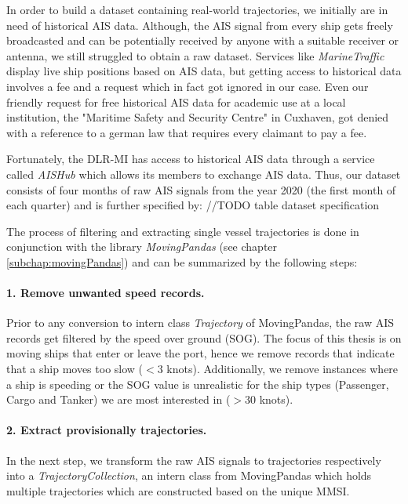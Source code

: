 In order to build a dataset containing real-world trajectories, we initially are in need of historical AIS data. Although, the AIS signal from every ship gets freely broadcasted and can be potentially received by anyone with a suitable receiver or antenna, we still struggled to obtain a raw dataset. Services like \textit{MarineTraffic} display live ship positions based on AIS data, but getting access to historical data involves a fee and a request which in fact got ignored in our case. Even our friendly request for free historical AIS data for academic use at a local institution, the "Maritime Safety and Security Centre" in Cuxhaven, got denied with a reference to a german law that requires every claimant to pay a fee.
\par
Fortunately, the DLR-MI has access to historical AIS data through a service called \textit{AISHub} which allows its members to exchange AIS data. Thus, our dataset consists of four months of raw AIS signals from the year 2020 (the first month of each quarter) and is further specified by:
//TODO table dataset specification
 
\par
The process of filtering and extracting single vessel trajectories is done  in  conjunction  with  the  library \textit{MovingPandas} (see chapter \ref{subchap:movingPandas}) and can be summarized by the following steps:
\paragraph{1. Remove unwanted speed records.}
Prior to any conversion to intern class \textit{Trajectory} of MovingPandas, the raw AIS records get filtered by the speed over ground (SOG). The focus of this thesis is on moving ships that enter or leave the port, hence we remove records that indicate that a ship moves too slow ($<3$ knots). Additionally, we remove instances where a ship is speeding or the SOG value is unrealistic for the ship types (Passenger, Cargo and Tanker) we are most interested in ($>30$ knots).

\paragraph{2. Extract provisionally trajectories.}
In the next step, we transform the raw AIS signals to trajectories respectively into a \textit{TrajectoryCollection}, an intern class from MovingPandas which holds multiple trajectories which are constructed based on the unique MMSI. 

